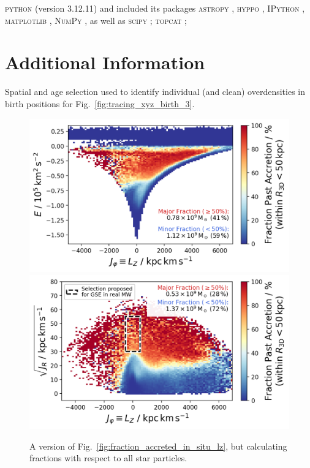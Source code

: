 \documentclass[fleqn,usenatbib]{mnras}
\begin{document}
\textsc{python} (version 3.12.11) and included its packages
\textsc{astropy} \citep[v. 7.1.0;][]{Robitaille2013,PriceWhelan2018},
\textsc{hyppo} \citep[v. 0.5.2;][]{hyppo},
\textsc{IPython} \citep[v. 9.1.0;][]{ipython},
\textsc{matplotlib} \citep[v. 3.10.3;][]{matplotlib},
\textsc{NumPy} \citep[v. 2.2.6;][]{numpy}, as well as
\textsc{scipy} \citep[v. 1.16.0;][]{Scipy}; \textsc{topcat} \citep[version 4.7;][]{Taylor2005};
 



\appendix

\section{Additional Information}

\begin{table}
    \centering
    \caption{Spatial and age selection used to identify individual (and clean) overdensities in birth positions for Fig.~\ref{fig:tracing_xyz_birth_3}.}
    \renewcommand{\arraystretch}{0.9}
    
    \label{tab:birth_position_tabular}
\end{table}

\begin{figure}
    \centering
    \includegraphics[width=0.49\linewidth]{figures/fraction_accreted_in_situ_lz_e_total.png}
    \includegraphics[width=0.49\linewidth]{figures/fraction_accreted_in_situ_lz_jr.png}
    \caption{A version of Fig.~\ref{fig:fraction_accreted_in_situ_lz}, but calculating fractions with respect to all star particles.}
    \label{fig:fraction_accreted_in_situ_lz_total}
\end{figure}
\end{document}
